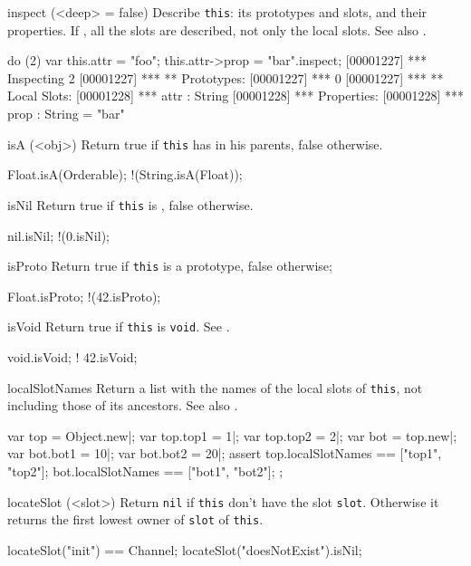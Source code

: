 \begin{urbiscriptapi}
\item[inspect](<deep> = false)%
  Describe \lstinline|this|: its prototypes and slots, and their
  properties.  If , all the slots are described, not only
  the local slots. See also .
\begin{urbiscript}
do (2) { var this.attr = "foo"; this.attr->prop = "bar"}.inspect;
[00001227] *** Inspecting 2
[00001227] *** ** Prototypes:
[00001227] ***   0
[00001227] *** ** Local Slots:
[00001228] ***   attr : String
[00001228] ***     Properties:
[00001228] ***      prop : String = "bar"
\end{urbiscript}

\item[isA](<obj>)%
  Return true if \lstinline|this| has  in his parents, false
  otherwise.
\begin{urbiassert}
Float.isA(Orderable);
!(String.isA(Float));
\end{urbiassert}

\item[isNil]
  Return true if \lstinline|this| is , false otherwise.
\begin{urbiassert}
nil.isNil;
!(0.isNil);
\end{urbiassert}

\item[isProto]
  Return true if \lstinline|this| is a prototype, false otherwise;
\begin{urbiassert}
Float.isProto;
!(42.isProto);
\end{urbiassert}

\item[isVoid]
  Return true if \lstinline|this| is \lstinline|void|.  See
  .
\begin{urbiassert}
void.isVoid;
! 42.isVoid;
\end{urbiassert}

\item[localSlotNames] Return a list with the names of the local slots of
  \lstinline|this|, not including those of its ancestors.  See also
  .
\begin{urbiscript}
var top = Object.new|;
var top.top1 = 1|;
var top.top2 = 2|;
var bot = top.new|;
var bot.bot1 = 10|;
var bot.bot2 = 20|;
assert
{
  top.localSlotNames == ["top1", "top2"];
  bot.localSlotNames == ["bot1", "bot2"];
};
\end{urbiscript}

\item[locateSlot](<slot>)%
  Return \lstinline|nil| if \lstinline|this| don't have the slot
  \lstinline|slot|. Otherwise it returns the first lowest owner of
  \lstinline|slot| of \lstinline|this|.
\begin{urbiassert}
locateSlot("init") == Channel;
locateSlot("doesNotExist").isNil;
\end{urbiassert}


\end{urbiscriptapi}
